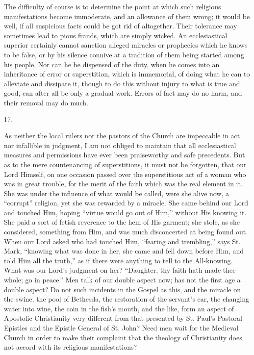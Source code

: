 The difficulty of course is to determine the point at which such
religious manifestations become immoderate, and an allowance of them
wrong; it would be well, if all suspicious facts could be got rid of
altogether. Their tolerance may sometimes lead to pious frauds, which
are simply wicked. An ecclesiastical superior certainly cannot
sanction alleged miracles or prophecies which he knows to be false, or
by his silence connive at a tradition of them being started among his
people. Nor can he be dispensed of the duty, when he comes into an
inheritance of error or superstition, which is immemorial, of doing
what he can to alleviate and dissipate it, though to do this without
injury to what is true and good, can after all be only a gradual work.
Errors of fact may do no harm, and their removal may do much.

17.

As neither the local rulers nor the pastors of the Church are
impeccable in act nor infallible in judgment, I am not obliged to
maintain that all ecclesiastical measures and permissions have ever
been praiseworthy and safe precedents. But as to the mere
countenancing of superstitions, it must not be forgotten, that our
Lord Himself, on one occasion passed over the superstitious act of a
woman who was in great trouble, for the merit of the faith which was
the real element in it. She was under the influence of what
would be called, were she alive now, a ``corrupt'' religion,
yet she was rewarded by a miracle. She came behind our Lord and
touched Him, hoping ``virtue would go out of Him,'' without
His knowing it. She paid a sort of fetish reverence to the hem of His
garment; she stole, as she considered, something from Him, and was
much disconcerted at being found out. When our Lord asked who had
touched Him, ``fearing and trembling,'' says St. Mark,
``knowing what was done in her, she came and fell down before Him,
and told Him all the truth,'' as if there were anything to tell to
the All-knowing. What was our Lord's judgment on her? ``Daughter,
thy faith hath made thee whole; go in peace.'' Men talk of our
double aspect now; has not the first age a double aspect? Do not such
incidents in the Gospel as this, and the miracle on the swine, the
pool of Bethesda, the restoration of the servant's ear, the changing
water into wine, the coin in the fish's mouth, and the like, form an
aspect of Apostolic Christianity very different from that presented by
St. Paul's Pastoral Epistles and the Epistle General of St. John? Need
men wait for the Medieval Church in order to make their complaint that
the theology of Christianity does not accord with its religious
manifestations?

